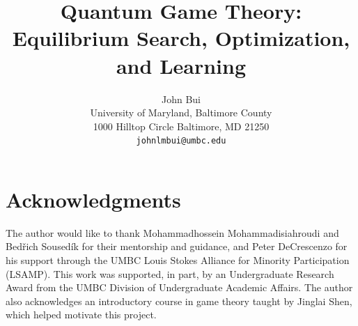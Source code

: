 \documentclass[10pt,twocolumn,letterpaper]{article}
\title{
	Quantum Game Theory:\\
	Equilibrium Search, Optimization, and Learning
}
\author{
	John Bui\\
	University of Maryland, Baltimore County\\
	1000 Hilltop Circle Baltimore, MD 21250\\
	{\tt\small johnlmbui@umbc.edu}
}
\begin{document}
\maketitle









\section*{Acknowledgments}

The author would like to thank Mohammadhossein Mohammadisiahroudi and Bed\v{r}ich Soused\'{i}k for their mentorship and guidance, and Peter DeCrescenzo for his support through the UMBC Louis Stokes Alliance for Minority Participation (LSAMP). This work was supported, in part, by an Undergraduate Research Award from the UMBC Division of Undergraduate Academic Affairs. The author also acknowledges an introductory course in game theory taught by Jinglai Shen, which helped motivate this project.

\nocite{nash,nielsen,jankowski,lau,ikeda,ferguson}

{
	\small
	
	
}

% 
\end{document}
